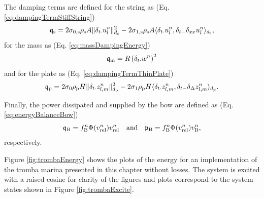 The damping terms are defined for the string as (Eq. \eqref{eq:dampingTermStiffString})
\begin{equation*}
    \q_\stxt = 2\szX[\stxt] \rho_\stxt A \lVert\dtd\uln\rVert_{d_\stxt}^2 - 2 \soX[\stxt] \rho_\stxt A \langle \dtd \uln, \dtm \dxx \uln \rangle_{d_\stxt},
\end{equation*}  
for the mass as (Eq. \eqref{eq:massDampingEnergy})
\begin{equation*}
    \mathfrak{q}_{\text{m}} = R\left(\delta_{t\cdot} w^n \right)^2
\end{equation*}
and for the plate as (Eq. \eqref{eq:dampingTermThinPlate})
\begin{equation*}
    \mathfrak{q}_{\text{p}} = 2\sigma_{0} \rho_{\text{p}} H \lVert\delta_{t\cdot}z_{l,m}^n\rVert_{d_{\text{p}}}^2 - 2 \sigma_{1} \rho_{\text{p}} H \langle \delta_{t\cdot} z_{l,m}^n, \delta_{t-} \delta_{\Delta}z_{l,m}^n \rangle_{d_{\text{p}}}.
\end{equation*}

Finally, the power dissipated and supplied by the bow are defined as (Eq. \eqref{eq:energyBalanceBow})
\begin{equation*}
    \mathfrak{q}_{\text{B}} =  f_{\text{B}}^n \Phi(v_\text{rel}^n) v_\text{rel}^n \quad \text{and} \quad \mathfrak{p}_{\text{B}} = f_{\text{B}}^n \Phi(v_\text{rel}^n)v_{\text{B}}^n,
\end{equation*}
respectively. 

Figure \ref{fig:trombaEnergy} shows the plots of the energy for an implementation of the tromba marina presented in this chapter without losses. The system is excited with a raised cosine for clarity of the figures and plots correspond to the system states shown in Figure \ref{fig:trombaExcite}.

    

